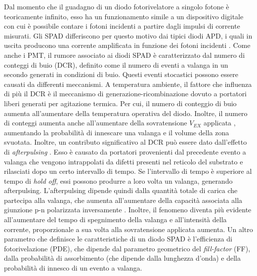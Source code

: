 Dal momento che il guadagno di un diodo fotorivelatore a singolo fotone è teoricamente infinito, esso ha un funzionamento simile a un dispositivo digitale con cui è possibile contare i fotoni incidenti a partire dagli impulsi di corrente misurati. Gli SPAD differiscono per questo motivo dai tipici diodi APD, i quali in uscita producono una corrente amplificata in funzione dei fotoni incidenti \cite{Jiang2019}. Come anche i PMT, il rumore associato ai diodi SPAD è caratterizzato dal numero di conteggi di buio (DCR), definito come il numero di eventi a valanga in un secondo generati in condizioni di buio. Questi eventi stocastici possono essere causati da differenti meccanismi. A temperatura ambiente, il fattore che influenza di più il DCR è il meccanismo di generazione-ricombinazione dovuto a portatori liberi generati per agitazione termica. Per cui, il numero di conteggio di buio aumenta all'aumentare della temperatura operativa del diodo. Inoltre, il numero di conteggi aumenta anche all'aumentare della sovratensione $V_{EX}$ applicata \cite{DiFranco2002}, aumentando la probabilità di innescare una valanga e il volume della zona svuotata. Inoltre, un contributo significativo al DCR può essere dato dall'effetto di \textit{afterpulsing} \cite{DiFranco2002}. Esso è causato da portatori provenienti dal precedente evento a valanga che vengono intrappolati da difetti presenti nel reticolo del substrato e rilasciati dopo un certo intervallo di tempo. Se l'intervallo di tempo è superiore al tempo di \textit{hold off}, essi possono produrre a loro volta un valanga, generando afterpulsing. L'afterpulsing dipende quindi dalla quantità totale di carica che partecipa alla valanga, che aumenta all'aumentare della capacità associata alla giunzione p-n polarizzata inversamente \cite{Palubiak2011}. Inoltre, il fenomeno diventa più evidente all'aumentare del tempo di spegnimento della valanga e all'intensità della corrente, proporzionale a sua volta alla sovratensione applicata aumenta. Un altro parametro che definisce le caratteristiche di un diodo SPAD è l'efficienza di fotorivelazione (PDE), che dipende dal parametro geometrico del \textit{fill-factor} (FF), dalla probabilità di assorbimento (che dipende dalla lunghezza d'onda) e della probabilità di innesco di un evento a valanga.

